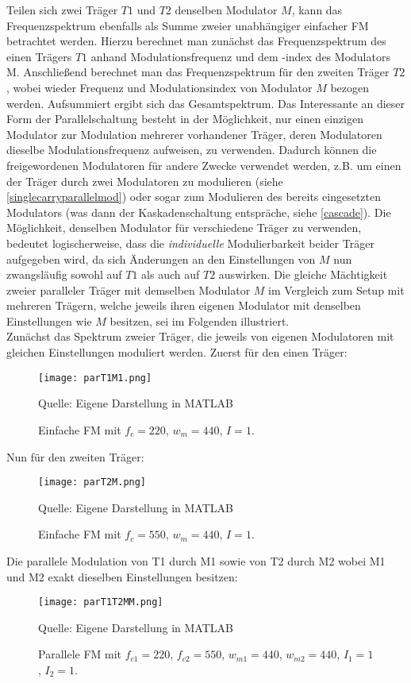 Teilen sich zwei Träger $T1$ und $T2$ denselben Modulator $M$, kann das Frequenzspektrum ebenfalls als Summe zweier unabhängiger einfacher FM betrachtet werden. Hierzu berechnet man zunächst das Frequenzspektrum des einen Trägers $T1$ anhand Modulationsfrequenz und dem -index des Modulators M. Anschließend berechnet man das Frequenzspektrum für den zweiten Träger $T2$, wobei wieder Frequenz und Modulationsindex von Modulator $M$ bezogen werden. Aufsummiert ergibt sich das Gesamtspektrum. Das Interessante an dieser Form der Parallelschaltung besteht in der Möglichkeit, nur einen einzigen Modulator zur Modulation mehrerer vorhandener Träger, deren Modulatoren dieselbe Modulationsfrequenz aufweisen, zu verwenden. Dadurch können die freigewordenen Modulatoren für andere Zwecke verwendet werden, z.B. um einen der Träger durch zwei Modulatoren zu modulieren (siehe \ref{singlecarryparallelmod}) oder sogar zum Modulieren des bereits eingesetzten Modulators (was dann der Kaskadenschaltung entspräche, siehe \ref{cascade}). Die Möglichkeit, denselben Modulator für verschiedene Träger zu verwenden, bedeutet logischerweise, dass die \textit{individuelle} Modulierbarkeit beider Träger aufgegeben wird, da sich Änderungen an den Einstellungen von $M$ nun zwangsläufig sowohl auf $T1$ als auch auf $T2$ auswirken. Die gleiche Mächtigkeit zweier paralleler Träger mit demselben Modulator $M$ im Vergleich zum Setup mit mehreren Trägern, welche jeweils ihren eigenen Modulator mit denselben Einstellungen wie $M$ besitzen, sei im Folgenden illustriert. \\
Zunächst das Spektrum zweier Träger, die jeweils von eigenen Modulatoren mit gleichen Einstellungen moduliert werden. Zuerst für den einen Träger:
\FloatBarrier
\begin{figure} [ht]
\centering
  \texttt{[image: parT1M1.png]}
\caption{Einfache FM mit $f_c = 220$, $w_m = 440$, $I = 1$. }
Quelle: Eigene Darstellung in MATLAB
\end{figure}
\FloatBarrier
Nun für den zweiten Träger:
\FloatBarrier
\begin{figure} [ht]
\centering
  \texttt{[image: parT2M.png]}
\caption{Einfache FM mit $f_c = 550$, $w_m = 440$, $I = 1$. }
Quelle: Eigene Darstellung in MATLAB
\end{figure}
\FloatBarrier
Die parallele Modulation von T1 durch M1 sowie von T2 durch M2 wobei M1 und M2 exakt dieselben Einstellungen besitzen:
\FloatBarrier
\begin{figure} [ht]
\centering
  \texttt{[image: parT1T2MM.png]}
\caption{Parallele FM mit $f_{c1} = 220$, $f_{c2} = 550$, $w_{m1} = 440$, $w_{m2} = 440$, $I_1 = 1$, $I_2 = 1$. }
Quelle: Eigene Darstellung in MATLAB
\end{figure}
